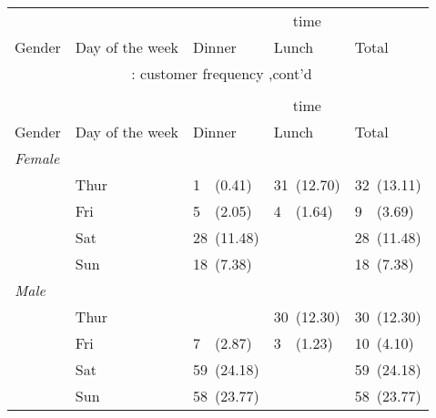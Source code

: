 \documentclass[8pt]{beamer}
\begin{document}
\begin{frame}
\hypertarget{customer frequency}{} 
\lfoot{\footnotesize }
\normalsize\begin{longtable}{lllll}
\toprule
&&
\multicolumn{ 3 }{c}{ time } \\
\cmidrule(lr){3-5}
Gender & Day of the week & Dinner & Lunch & Total \\
\hline
\endfirsthead
\multicolumn{5}{c}{\tablename~\thetable{}: customer frequency ,cont'd}\\\\
\toprule
&&
\multicolumn{ 3 }{c}{ time } \\
\cmidrule(lr){3-5}
Gender & Day of the week & Dinner & Lunch & Total \\
\hline
\endhead
\multicolumn{ 4 }{l}{\textit{ Female }}\\
& Thur & 1~~(0.41) & 31~(12.70) & 32~(13.11) \\
 & Fri & 5~~(2.05) & 4~~(1.64) & 9~~(3.69) \\
 & Sat & 28~(11.48) &  & 28~(11.48) \\
 & Sun & 18~(7.38) &  & 18~(7.38) \\
[2ex]
\multicolumn{ 4 }{l}{\textit{ Male }}\\
& Thur &  & 30~(12.30) & 30~(12.30) \\
 & Fri & 7~~(2.87) & 3~~(1.23) & 10~(4.10) \\
 & Sat & 59~(24.18) &  & 59~(24.18) \\
 & Sun & 58~(23.77) &  & 58~(23.77) \\
[2ex]
\bottomrule\end{longtable}
\end{frame}
\end{document}
